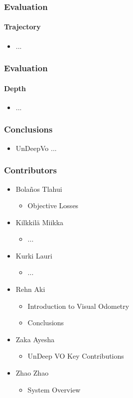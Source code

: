 \documentclass{beamer}
\begin{document}
\begin{frame}
	\frametitle{Evaluation}
    \framesubtitle{Trajectory}
    \begin{itemize}
        \item ...
    \end{itemize}
\end{frame}

\begin{frame}
	\frametitle{Evaluation}
    \framesubtitle{Depth}
    \begin{itemize}
        \item ...
    \end{itemize}
\end{frame}

\begin{frame}
    \frametitle{Conclusions}
    \begin{itemize}
        \item UnDeepVo ...
    \end{itemize}
\end{frame}

\begin{frame}
    \frametitle{Contributors}
    \begin{itemize}
        \item Bola\~nos Tlahui
            \begin{itemize}
                \item Objective Losses
            \end{itemize}
        \item Kilkkilä Miikka
            \begin{itemize}
                \item ...
            \end{itemize}
        \item Kurki Lauri
            \begin{itemize}
                \item ...
            \end{itemize}
        \item Rehn Aki
            \begin{itemize}
                \item Introduction to Visual Odometry
                \item Conclusions
            \end{itemize}
        \item Zaka Ayesha
            \begin{itemize}
                \item UnDeep VO Key Contributions
            \end{itemize}
        \item Zhao Zhao
            \begin{itemize}
                \item System Overview
            \end{itemize}
    \end{itemize}
\end{frame}
\end{document}
